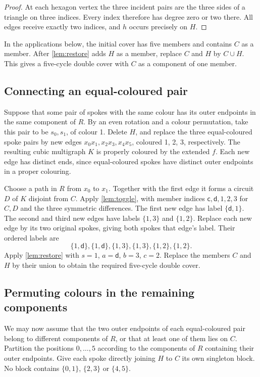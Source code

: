 \documentclass[justified,notoc,twoside,nobib,nofonts]{tufte-handout}
\begin{document}
\begin{proof}
At each hexagon vertex the three incident pairs are the three sides
of a triangle on three indices. Every index therefore has degree
zero or two there. All edges receive exactly two indices, and $h$
occurs precisely on $H$.
\end{proof}

In the applications below, the initial cover has five members and
contains $C$ as a member. After \cref{lem:restore} adds $H$ as a
member, replace $C$ and $H$ by $C\cup H$. This gives a five-cycle
double cover with $C$ as a component of one member.

\subsection{Connecting an equal-coloured pair}

Suppose that some pair of spokes with the same colour has its outer
endpoints in the same component of $R$. By an even rotation and a
colour permutation, take this pair to be $s_0,s_1$, of colour 1.
Delete $H$, and replace the three equal-coloured spoke pairs by new
edges $x_0x_1,x_2x_3,x_4x_5$, coloured 1, 2, 3, respectively.
The resulting cubic multigraph $K$ is properly coloured by the
extended $f$. Each new edge has distinct ends, since equal-coloured
spokes have distinct outer endpoints in a proper colouring.

Choose a path in $R$ from $x_0$ to $x_1$. Together with the first
edge it forms a circuit $D$ of $K$ disjoint from $C$. Apply
\cref{lem:toggle}, with member indices $\mathsf c,\mathsf d,1,2,3$
for $C,D$ and the three symmetric differences. The first new edge has label
$\{\mathsf d,1\}$. The second and third new edges have labels
$\{1,3\}$ and $\{1,2\}$. Replace each new edge by its two original
spokes, giving both spokes that edge's label. Their ordered labels are
\[
 \{1,\mathsf d\},\{1,\mathsf d\},
 \{1,3\},\{1,3\},\{1,2\},\{1,2\}.
\]
Apply \cref{lem:restore} with $s=1$, $a=\mathsf d$, $b=3$, $c=2$.
Replace the members $C$ and $H$ by their union to obtain the
required five-cycle double cover.

\subsection{Permuting colours in the remaining components}

We may now assume that the two outer endpoints of each equal-coloured
pair belong to different components of $R$, or that at least one of
them lies on $C$. Partition the positions $0,\dots,5$ according to
the components of $R$ containing their outer endpoints. Give each
spoke directly joining $H$ to $C$ its own singleton block. No block
contains $\{0,1\}$, $\{2,3\}$ or $\{4,5\}$.
\end{document}
